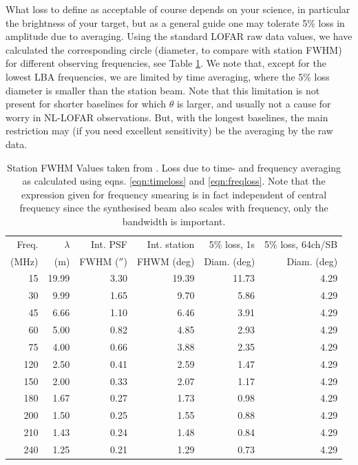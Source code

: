 \documentclass[graybox]{svmult}
\begin{document}
What loss to define as acceptable of course depends on your science, in
particular the brightness of your target, but as a general guide one may
tolerate 5\% loss in amplitude due to averaging. Using the standard LOFAR raw
data values, we have calculated the corresponding circle (diameter, to compare
with station FWHM) for different observing frequencies, see Table
\ref{tab:res}. We note that, except for the lowest LBA frequencies, we are
limited by time averaging, where the 5\% loss diameter is smaller than the
station beam. Note that this limitation is not present for shorter baselines
for which $\theta$ is larger, and usually not a cause for worry in NL-LOFAR
observations. But, with the longest baselines, the main restriction may (if you
need excellent sensitivity) be the averaging by the raw data. 


\begin{table}[h]
\centering
\begin{tabular}{rrrrrr}
\hline\hline
Freq. & $\lambda$ & Int. PSF & Int. station& 5\% loss, 1s& 5\% loss, 64ch/SB\\
(MHz) & (m) & FWHM ($''$) & FHWM (deg) & Diam. (deg) & Diam. (deg)\\
\hline
15 & 19.99 & 3.30 & 19.39 & 11.73 & 4.29\\
30 & 9.99 & 1.65 & 9.70 & 5.86 & 4.29\\
45 & 6.66 & 1.10 & 6.46 & 3.91 & 4.29\\
60 & 5.00 & 0.82 & 4.85 & 2.93 & 4.29\\
75 & 4.00 & 0.66 & 3.88 & 2.35 & 4.29\\
120 & 2.50 & 0.41 & 2.59 & 1.47 & 4.29\\
150 & 2.00 & 0.33 & 2.07 & 1.17 & 4.29\\
180 & 1.67 & 0.27 & 1.73 & 0.98 & 4.29\\
200 & 1.50 & 0.25 & 1.55 & 0.88 & 4.29\\
210 & 1.43 & 0.24 & 1.48 & 0.84 & 4.29\\
240 & 1.25 & 0.21 & 1.29 & 0.73 & 4.29\\
\hline
\end{tabular}
\caption{Station FWHM Values taken from \cite[App. B]{vanhaarlem13}. Loss due
to time- and frequency averaging as calculated using eqns.
\ref{eqn:timeloss} and \ref{eqn:freqloss}. Note that the expression
given for frequency smearing is in fact independent of central frequency since
the synthesised beam also scales with frequency, only the
bandwidth is important.
\label{tab:res}}
\end{table}
\end{document}
